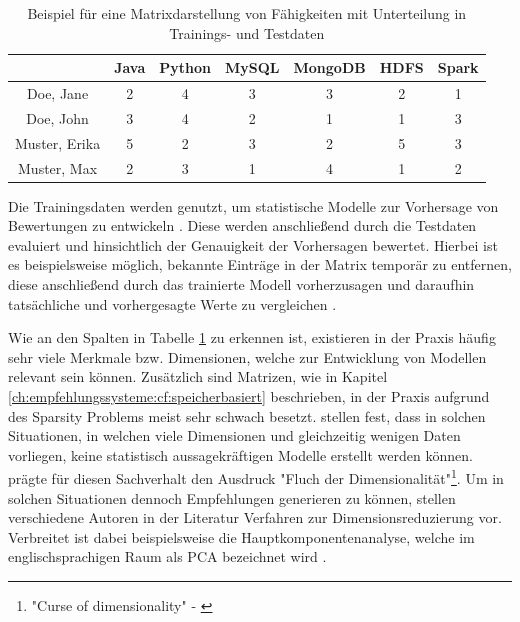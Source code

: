 \begin{table}[h]
	\centering
	\begin{tabular}{c|c|c|c|c|c|c}
		& Java & Python & MySQL & MongoDB & HDFS & Spark\\ 
		\hline
		Doe, Jane 		& \cellcolor{itemcolor}2 & \cellcolor{usercolor}4 & \cellcolor{itemcolor}3 & \cellcolor{usercolor}3 & \cellcolor{itemcolor}2 & \cellcolor{usercolor}1\\
		Doe, John 		& \cellcolor{usercolor}3 & \cellcolor{itemcolor}4 & \cellcolor{usercolor}2 & \cellcolor{itemcolor}1 & \cellcolor{usercolor}1 & \cellcolor{itemcolor}3\\
		Muster, Erika 	& \cellcolor{itemcolor}5 & \cellcolor{usercolor}2 & \cellcolor{itemcolor}3 & \cellcolor{usercolor}2 & \cellcolor{usercolor}5 & \cellcolor{usercolor}3\\
		Muster, Max 	& \cellcolor{usercolor}2 & \cellcolor{usercolor}3 & \cellcolor{usercolor}1 & \cellcolor{itemcolor}4 & \cellcolor{usercolor}1 & \cellcolor{itemcolor}2
	\end{tabular}
	\caption{Beispiel für eine Matrixdarstellung von Fähigkeiten mit Unterteilung in Trainings- und Testdaten}
	\label{tbl:empfehlungssysteme:cf:modellbasiert:tbl1}
\end{table}

Die Trainingsdaten werden genutzt, um statistische Modelle zur Vorhersage von Bewertungen zu entwickeln \cite[S. 71f.]{recommenderSystems:2016}.  Diese werden anschließend durch die Testdaten evaluiert und hinsichtlich der Genauigkeit der Vorhersagen bewertet. Hierbei ist es beispielsweise möglich, bekannte Einträge in der Matrix temporär zu entfernen, diese anschließend durch das trainierte Modell vorherzusagen und daraufhin tatsächliche und vorhergesagte Werte zu vergleichen \cite[S. 3ff.]{kang:2016}.

Wie an den Spalten in Tabelle \ref{tbl:empfehlungssysteme:cf:modellbasiert:tbl1} zu erkennen ist, existieren in der Praxis häufig sehr viele Merkmale bzw. Dimensionen, welche zur Entwicklung von Modellen relevant sein können. Zusätzlich sind Matrizen, wie in Kapitel \ref{ch:empfehlungssysteme:cf:speicherbasiert} beschrieben, in der Praxis aufgrund des Sparsity Problems meist sehr schwach besetzt. \textcite[S. 1]{boratto:2014} stellen fest, dass in solchen Situationen, in welchen viele Dimensionen und gleichzeitig wenigen Daten vorliegen, keine statistisch aussagekräftigen Modelle erstellt werden können. \textcite[S. 94]{bellman:1961} prägte für diesen Sachverhalt den Ausdruck "Fluch der Dimensionalität"\footnote{"Curse of dimensionality" - \textcite[S. 94]{bellman:1961}}. Um in solchen Situationen dennoch Empfehlungen generieren zu können, stellen verschiedene Autoren in der Literatur Verfahren zur Dimensionsreduzierung vor. Verbreitet ist dabei beispielsweise die Hauptkomponentenanalyse, welche im englischsprachigen Raum als \ac{PCA} bezeichnet wird \cite[S. 1ff.]{vaswani:2018}.

